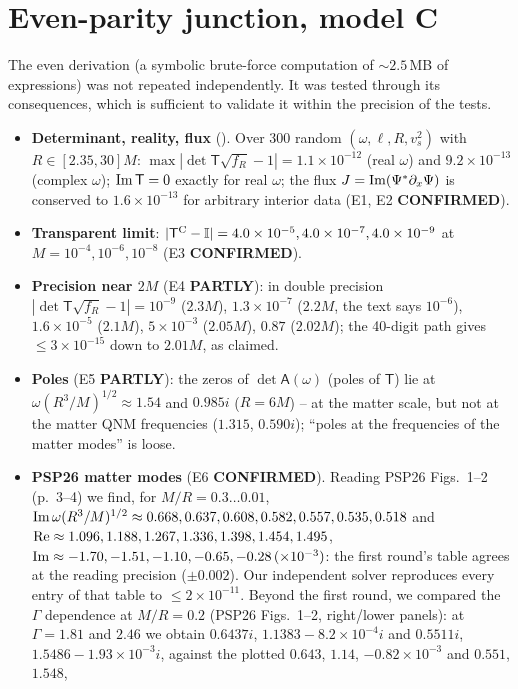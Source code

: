 \documentclass[11pt,a4paper]{article}
\newcommand{\sq}{\sqrt{f_R}}
\newcommand{\OK}{\textcolor{green!50!black}{\textbf{CONFIRMED}}}
\newcommand{\PART}{\textcolor{orange!85!black}{\textbf{PARTLY}}}
\newcommand{\file}[1]{{\small\path{#1}}}
\begin{document}
\section{Even-parity junction, model C}\label{sec:even}
The even derivation (a symbolic brute-force computation of $\sim2.5$\,MB of expressions) was not repeated
independently. It was tested through its consequences, which is sufficient to validate it within the precision
of the tests.
\begin{itemize}
\item \textbf{Determinant, reality, flux} (\file{c06}). Over 300 random $(\omega,\ell,R,v_s^2)$ with $R\in[2.35,30]M$:
$\max|\det\mathsf T\sq-1|=1.1\times10^{-12}$ (real $\omega$) and $9.2\times10^{-13}$ (complex $\omega$); ${\rm Im}\,\mathsf T=0$
exactly for real $\omega$; the flux $J={\rm Im}(\Psi^*\partial_x\Psi)$ is conserved to $1.6\times10^{-13}$ for arbitrary
interior data (E1, E2 \OK).
\item \textbf{Transparent limit}: $|\mathsf T^{\rm C}-\mathbb I|=4.0\times10^{-5},4.0\times10^{-7},4.0\times10^{-9}$ at
$M=10^{-4},10^{-6},10^{-8}$ (E3 \OK).
\item \textbf{Precision near $2M$} (E4 \PART): in double precision $|\det\mathsf T\sq-1|=10^{-9}$ ($2.3M$),
$1.3\times10^{-7}$ ($2.2M$, the text says $10^{-6}$), $1.6\times10^{-5}$ ($2.1M$), $5\times10^{-3}$ ($2.05M$), $0.87$
($2.02M$); the 40-digit path gives $\le3\times10^{-15}$ down to $2.01M$, as claimed.
\item \textbf{Poles} (E5 \PART): the zeros of $\det\mathsf A(\omega)$ (poles of $\mathsf T$) lie at
$\omega(R^3/M)^{1/2}\approx1.54$ and $0.985i$ ($R=6M$) -- at the matter scale, but not at the matter QNM frequencies
($1.315$, $0.590i$); ``poles at the frequencies of the matter modes'' is loose.
\item \textbf{PSP26 matter modes} (E6 \OK). Reading PSP26 Figs.~1--2 (p.~3--4) we find, for $M/R=0.3\dots0.01$,
${\rm Im}\,\omega(R^3/M)^{1/2}\approx0.668,0.637,0.608,0.582,0.557,0.535,0.518$ and ${\rm Re}\approx
1.096,1.188,1.267,1.336,1.398,1.454,1.495$, ${\rm Im}\approx-1.70,-1.51,-1.10,-0.65,-0.28\,(\times10^{-3})$: the
first round's table agrees at the reading precision ($\pm0.002$). Our independent solver reproduces every entry of
that table to $\le2\times10^{-11}$. Beyond the first round, we compared the $\Gamma$ dependence at $M/R=0.2$
(PSP26 Figs.~1--2, right/lower panels): at $\Gamma=1.81$ and $2.46$ we obtain $0.6437i$, $1.1383-8.2\times10^{-4}i$ and
$0.5511i$, $1.5486-1.93\times10^{-3}i$, against the plotted $0.643$, $1.14$, $-0.82\times10^{-3}$ and $0.551$, $1.548$,

\end{itemize}
\end{document}
